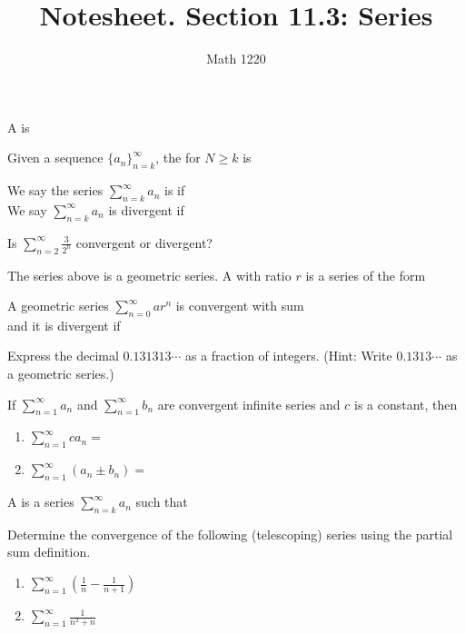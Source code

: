\documentclass[12pt, a4paper]{article}
\author{Math 1220}
\title{Notesheet. Section 11.3: Series}
\date{}
\begin{document}
\maketitle
\nameline
\begin{defi}
  A  is
\end{defi}
\begin{defi}
  Given a sequence \(\{a_n\}_{n=k}^\infty\), the  for \(N \geq k\) is \\
\end{defi}
\begin{defi}
  We say the series \(\sum_{n=k}^\infty a_n\) is  if \\

  We say \(\sum_{n=k}^\infty a_n\) is divergent if 
\end{defi}
\begin{ex}
  Is \(\sum_{n=2}^\infty \frac{3}{2^n}\) convergent or divergent?
\end{ex}
\begin{defi}
  The series above is a geometric series. A  with
  ratio \(r\) is a series of the form
\end{defi}
\begin{thrm}
  A geometric series \(\sum_{n=0}^\infty ar^n\) is convergent with sum
  \\

  and it is divergent if 
\end{thrm}
\vspace{-1in}
\begin{ex}
  Express the decimal \(0.131313\cdots\) as a fraction of
  integers. (Hint: Write \(0.1313\cdots\) as a geometric series.)
\end{ex}
\begin{thrm}
  If \(\sum_{n=1}^\infty a_n\) and \(\sum_{n=1}^\infty b_n\) are
  convergent infinite series and \(c\) is a constant, then
  \begin{enumerate}
  \item \(\sum_{n=1}^\infty ca_n = \)
  \item \(\sum_{n=1}^\infty (a_n \pm b_n) = \)
  \end{enumerate}
\end{thrm}
\vspace{-1in}
\begin{defi}
  A  is a series \(\sum_{n=k}^\infty a_n\) such that
\end{defi}
\begin{ex}
  Determine the convergence of the following (telescoping) series using
  the partial 
  sum definition.
  \begin{enumerate}
  \item \(\sum_{n=1}^\infty \left( \frac{1}{n} - \frac{1}{n+1}
    \right)\)
    \vspace{1in}
  \item \(\sum_{n=1}^\infty \frac{1}{n^2+n}\)
  \end{enumerate}
\end{ex}
\vspace{-1.5in}
\end{document}
